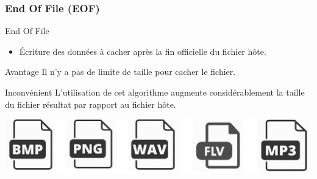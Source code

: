 \documentclass{beamer}
\begin{document}
    \subsubsection{End Of File (EOF)}
    \begin{frame}
    
	\begin{block}{End Of File}
	\begin{itemize}
	[circle]
	\item Écriture des données à cacher après la fin officielle du fichier 
	hôte. 
	\end{itemize}
	\end{block}
	
	\begin{exampleblock}{Avantage} 
	Il n'y a pas de limite de taille pour cacher le fichier. 
	\end{exampleblock}
	
	\begin{alertblock}{Inconvénient} 
	L'utilisation de cet algorithme augmente considérablement la taille du 
	fichier résultat par rapport au fichier hôte. 
	\end{alertblock}
	
	\hspace{1cm}
    \includegraphics[scale=0.2]{pictures/eof.png}
    
    \end{frame}
    
\end{document}
